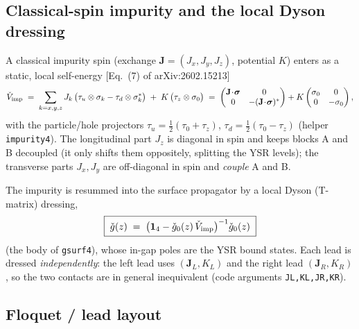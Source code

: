 \documentclass[11pt,a4paper]{article}
\newcommand{\id}{\mathbf{1}}          %
\newcommand{\half}{\tfrac{1}{2}}
\begin{document}
\subsection{Classical-spin impurity and the local Dyson dressing}
\label{sec:ysr_imp}

A classical impurity spin (exchange $\mathbf J=(J_x,J_y,J_z)$, potential $K$)
enters as a static, local self-energy [Eq.~(7) of arXiv:2602.15213]
\begin{equation}
  \check V_{\rm imp}
  \;=\; \sum_{k=x,y,z} J_k\,\big(\tau_u\otimes\sigma_k-\tau_d\otimes\sigma_k^{*}\big)
        \;+\; K\,\big(\tau_z\otimes\sigma_0\big)
  \;=\;
  \begin{pmatrix}
    \mathbf J\!\cdot\!\boldsymbol\sigma & 0\\
    0 & -(\mathbf J\!\cdot\!\boldsymbol\sigma)^{*}
  \end{pmatrix}
  + K
  \begin{pmatrix}\sigma_0 & 0\\ 0 & -\sigma_0\end{pmatrix},
  \label{eq:Vimp}
\end{equation}
with the particle/hole projectors $\tau_{u}=\half(\tau_0+\tau_z)$,
$\tau_{d}=\half(\tau_0-\tau_z)$ (helper \texttt{impurity4}).  The longitudinal
part $J_z$ is diagonal in spin and keeps blocks A and B decoupled (it only shifts
them oppositely, splitting the YSR levels); the transverse parts $J_x,J_y$ are
off-diagonal in spin and \emph{couple} A and B.

The impurity is resummed into the surface propagator by a local Dyson (T-matrix)
dressing,
\begin{equation}
  \boxed{\;\check g(z) \;=\; \big(\id_4-\check g_0(z)\,\check V_{\rm imp}\big)^{-1}\check g_0(z)\;}
  \label{eq:local_dyson}
\end{equation}
(the body of \texttt{gsurf4}), whose in-gap poles are the YSR bound states.  Each
lead is dressed \emph{independently}: the left lead uses $(\mathbf J_L,K_L)$ and
the right lead $(\mathbf J_R,K_R)$, so the two contacts are in general
inequivalent (code arguments \texttt{JL,KL,JR,KR}).

\subsection{Floquet / lead layout}
\label{sec:ysr_floquet}
\end{document}
